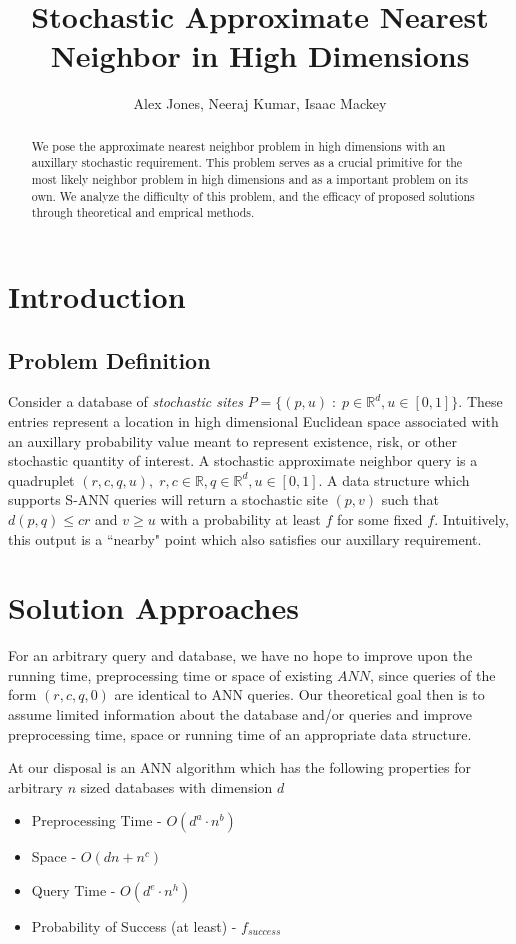 \documentclass[10pt,a4paper]{article}
\author{Alex Jones, Neeraj Kumar, Isaac Mackey}
\title{\vspace{-3em}Stochastic Approximate Nearest Neighbor in High Dimensions}
\begin{document}
\maketitle
\begin{abstract}
  We pose the approximate nearest neighbor problem in high dimensions with an auxillary stochastic requirement. This problem serves as a crucial primitive for the most likely neighbor problem in high dimensions and as a important problem on its own. We analyze the difficulty of this problem, and the efficacy of proposed solutions through theoretical and emprical methods.
\end{abstract}
\section{Introduction} 

\subsection{Problem Definition}
Consider a database of \textsl{stochastic sites} $P = \lbrace (p,u) \;:\; p \in \mathbb{R}^d, u \in [0,1] \rbrace$. These entries represent a location in high dimensional Euclidean space associated with an auxillary probability value meant to represent existence, risk, or other stochastic quantity of interest. A stochastic approximate neighbor query is a quadruplet $(r,c,q,u),\; r,c \in \mathbb{R}, q \in \mathbb{R}^d, u \in [0,1]$. A data structure which supports S-ANN queries will return a stochastic site $(p,v)$ such that $d(p,q) \leq cr$ and $v \geq u$ with a probability at least $f$ for some fixed $f$. Intuitively, this output is a ``nearby" point which also satisfies our auxillary requirement.

\section{Solution Approaches}

For an arbitrary query and database, we have no hope to improve upon the running time, preprocessing time or space of existing $ANN$, since queries of the form $(r,c,q,0)$ are identical to ANN queries. Our theoretical goal then is to assume limited information about the database and/or queries and improve preprocessing time, space or running time of an appropriate data structure.

At our disposal is an ANN algorithm which has the following properties for arbitrary $n$ sized databases with dimension $d$ 
\begin{itemize}
  \item{Preprocessing Time - $O(d^a \cdot n^b)$}
  \item{Space - $O(dn + n^c)$}
  \item{Query Time - $O(d^e \cdot n^h)$}
  \item{Probability of Success (at least) - $f_{success}$}
\end{itemize}
\end{document}
